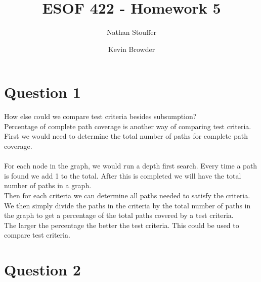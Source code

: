 \documentclass{article}
\begin{document}
\title{ESOF 422 - Homework 5}
\author{Nathan Stouffer \and Kevin Browder}

\maketitle
\newpage
\section*{Question 1}
How else could we compare test criteria besides subsumption?\\
Percentage of complete path coverage is another way of comparing test criteria. First we would need to determine the total number of paths for complete path coverage. \\\\
For each node in the graph, we would run a depth first search. Every time a path is found we add 1 to the total. After this is completed we will have the total number of paths in a graph. \\Then for each criteria we can determine all paths needed to satisfy the criteria. We then simply divide the paths in the criteria by the total number of paths in the graph to get a percentage of the total paths covered by a test criteria. \\ The larger the percentage the better the test criteria. This could be used to compare test criteria.  

\newpage
\section*{Question 2}
\end{document}
